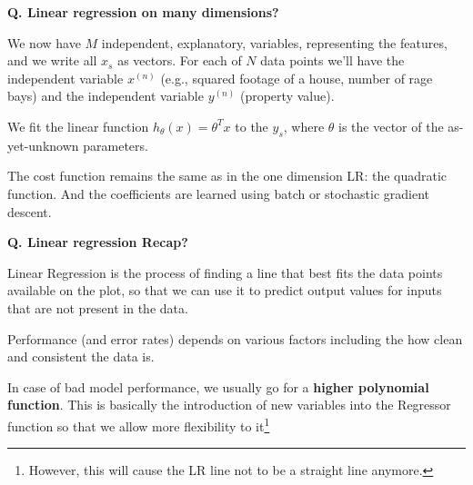 \begin{frame}[fragile]{\textbf{Q. Linear regression on many dimensions?}}
  \begin{wideitemize}
    \item We now have $M$ independent, explanatory, variables, representing the
      features, and we write all $x_s$ as vectors. For each of $N$ data points
      we'll have the independent variable $x^{(n)}$ (e.g., squared footage of a
      house, number of rage bays) and the independent variable $y^{(n)}$
      (property value).
    \item We fit the linear function $h_{\theta}(x) = \theta^{T}x$ to the $y_s$,
      where $\theta$ is the vector of the as-yet-unknown parameters.
    \item The cost function remains the same as in the one dimension LR: the
      quadratic function. And the coefficients are learned using batch or
      stochastic gradient descent.
  \end{wideitemize}
\end{frame}


\begin{frame}[fragile]{\textbf{Q. Linear regression Recap?}}
  \begin{wideitemize}
    \item Linear Regression is the process of finding a line that best fits the data
    points available on the plot, so that we can use it to predict output values for
    inputs that are not present in the data.
    \item Performance (and error rates) depends on various factors including the
    how clean and consistent the data is.
    \item In case of bad model performance, we usually go for a \textbf{higher polynomial function}.
    This is basically the introduction of new variables into the Regressor function so
    that we allow more flexibility to it\footnote{However, this will cause the LR line
    not to be a straight line anymore.}
  \end{wideitemize}
\end{frame}

